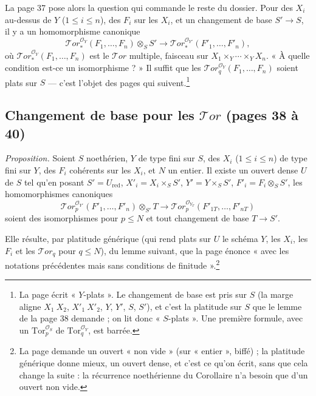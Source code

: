 \documentclass[11pt,a4paper]{article}
\begin{document}
La page 37 pose alors la question qui commande le reste du dossier. Pour
des $X_i$ au-dessus de $Y$ ($1 \leq i \leq n$), des $F_i$ sur les $X_i$, et
un changement de base $S' \to S$, il y a un homomorphisme canonique
\[
  \mathcal{T}or^{\mathcal{O}_Y}_{*}(F_1, \ldots, F_n) \otimes_S S'
  \longrightarrow
  \mathcal{T}or^{\mathcal{O}_{Y'}}_{*}(F'_1, \ldots, F'_n),
\]
où $\mathcal{T}or^{\mathcal{O}_Y}_{*}(F_1, \ldots, F_n)$ est le
$\mathcal{T}or$ multiple, faisceau sur $X_1 \times_Y \cdots \times_Y X_n$.
« À quelle condition est-ce un isomorphisme ? » Il suffit que les
$\mathcal{T}or^{\mathcal{O}_Y}_{q}(F_1, \ldots, F_n)$ soient plats sur
$S$ --- c'est l'objet des pages qui suivent.\footnote{La page écrit
« $Y$-plats ». Le changement de base est pris sur $S$ (la marge aligne
$X_1\ X_2$, $X'_1\ X'_2$, $Y$, $Y'$, $S$, $S'$), et c'est la platitude sur
$S$ que le lemme de la page 38 demande ; on lit donc « $S$-plats ». Une
première formule, avec un $\mathrm{Tor}^{\mathcal{O}_S}_{p}$ de
$\mathrm{Tor}^{\mathcal{O}_Y}_{q}$, est barrée.}

\subsection*{Changement de base pour les $\mathcal{T}or$ (pages 38 à 40)}

\emph{Proposition.} Soient $S$ noethérien, $Y$ de type fini sur $S$, des
$X_i$ ($1 \leq i \leq n$) de type fini sur $Y$, des $F_i$ cohérents sur les
$X_i$, et $N$ un entier. Il existe un ouvert dense $U$ de $S$ tel qu'en
posant $S' = U_{\mathrm{red}}$, $X'_i = X_i \times_S S'$,
$Y' = Y \times_S S'$, $F'_i = F_i \otimes_S S'$, les homomorphismes
canoniques
\[
  \mathcal{T}or^{\mathcal{O}_{Y'}}_{p}(F'_1, \ldots, F'_n) \otimes_{S'} T
  \longrightarrow
  \mathcal{T}or^{\mathcal{O}_{Y_T}}_{p}(F'_{1T}, \ldots, F'_{nT})
\]
soient des isomorphismes pour $p \leq N$ et tout changement de base
$T \to S'$.

Elle résulte, par platitude générique (qui rend plats sur $U$ le schéma $Y$,
les $X_i$, les $F_i$ et les $\mathcal{T}or_q$ pour $q \leq N$), du lemme
suivant, que la page énonce « avec les notations précédentes mais sans
conditions de finitude ».\footnote{La page demande un ouvert « non vide »
(sur « entier », biffé) ; la platitude générique donne mieux, un ouvert
dense, et c'est ce qu'on écrit, sans que cela change la suite : la
récurrence noethérienne du Corollaire n'a besoin que d'un ouvert non vide.}
\end{document}

